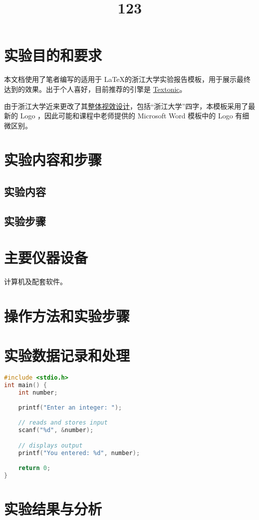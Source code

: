 \documentclass{zjureport}
\title{123}
\date{\zhtoday}
\begin{document}
\makecover %
\makeheader

\section{实验目的和要求}
本文档使用了笔者编写的适用于 \LaTeX 的浙江大学实验报告模板，用于展示最终达到的效果。出于个人喜好，目前推荐的引擎是 \href{https://github.com/tectonic-typesetting/tectonic/}{Textonic}。

由于浙江大学近来更改了其\href{https://www.zju.edu.cn/572/list.htm}{整体视效设计}，包括``浙江大学''四字，本模板采用了最新的 Logo ，因此可能和课程中老师提供的 Microsoft Word 模板中的 Logo 有细微区别。

\section{实验内容和步骤}

\subsection{实验内容}

\subsection{实验步骤}

\section{主要仪器设备}
计算机及配套软件。

\section{操作方法和实验步骤}

\section{实验数据记录和处理}

\begin{lstlisting}[language=C]
#include <stdio.h>
int main() {   
    int number;
   
    printf("Enter an integer: ");  
    
    // reads and stores input
    scanf("%d", &number);

    // displays output
    printf("You entered: %d", number);
    
    return 0;
}
\end{lstlisting}

\section{实验结果与分析}
\end{document}
